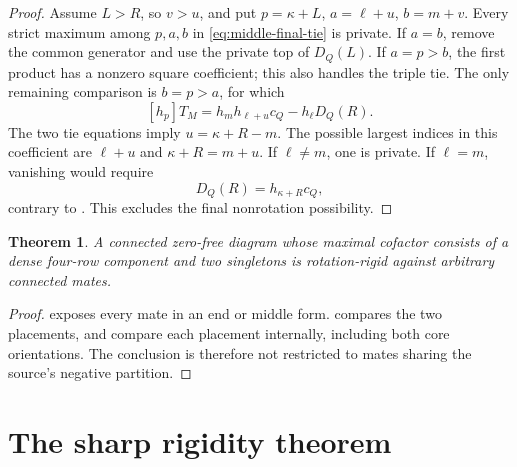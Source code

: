 \documentclass[11pt,a4paper]{amsart}
\numberwithin{equation}{section}
\theoremstyle{plain}
\newtheorem{theorem}{Theorem}[section]
\theoremstyle{definition}
\begin{document}
\begin{proof}
Assume \(L>R\), so \(v>u\), and put
\(p=\kappa+L\), \(a=\ell+u\), \(b=m+v\).
Every strict maximum among \(p,a,b\) in \eqref{eq:middle-final-tie} is private.  If \(a=b\), remove the common generator and use the private top of \( D_Q(L)\).  If \(a=p>b\), the first product has a nonzero square coefficient; this also handles the triple tie.  The only remaining comparison is \(b=p>a\), for which
\[
 [h_p]T_M=h_mh_{\ell+u}c_Q-h_\ell D_Q(R).
\]
The two tie equations imply \(u=\kappa+R-m\).  The possible largest indices in this coefficient are \(\ell+u\) and \(\kappa+R=m+u\).  If \(\ell\ne m\), one is private.  If \(\ell=m\), vanishing would require
\[
  D_Q(R)=h_{\kappa+R}c_Q,
\]
contrary to .  This excludes the final nonrotation possibility.
\end{proof}

\begin{theorem}\label{thm:dense-three-component-rigidity}
A connected zero-free diagram whose maximal cofactor consists of a dense four-row component and two singletons is rotation-rigid against arbitrary connected mates.
\end{theorem}

\begin{proof}
 exposes every mate in an end or middle form.   compares the two placements, and  compare each placement internally, including both core orientations.  The conclusion is therefore not restricted to mates sharing the source's negative partition.
\end{proof}

\section{The sharp rigidity theorem}\label{sec:threshold-proof}
\end{document}
